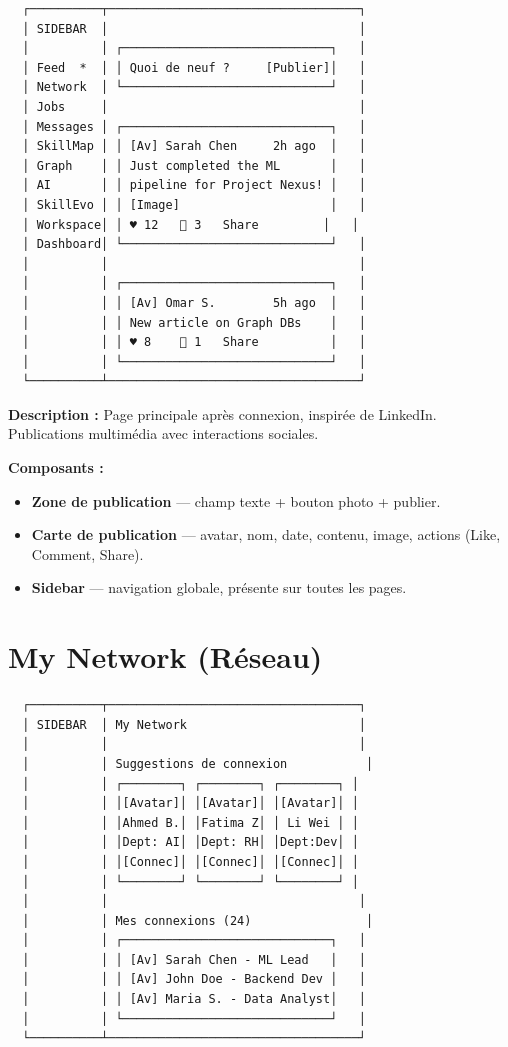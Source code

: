 \documentclass[12pt,a4paper]{article}
\begin{document}
\begin{verbatim}
  ┌──────────┬───────────────────────────────────┐
  │ SIDEBAR  │                                   │
  │          │ ┌─────────────────────────────┐   │
  │ Feed  *  │ │ Quoi de neuf ?     [Publier]│   │
  │ Network  │ └─────────────────────────────┘   │
  │ Jobs     │                                   │
  │ Messages │ ┌─────────────────────────────┐   │
  │ SkillMap │ │ [Av] Sarah Chen     2h ago  │   │
  │ Graph    │ │ Just completed the ML       │   │
  │ AI       │ │ pipeline for Project Nexus! │   │
  │ SkillEvo │ │ [Image]                     │   │
  │ Workspace│ │ ♥ 12   💬 3   Share         │   │
  │ Dashboard│ └─────────────────────────────┘   │
  │          │                                   │
  │          │ ┌─────────────────────────────┐   │
  │          │ │ [Av] Omar S.        5h ago  │   │
  │          │ │ New article on Graph DBs    │   │
  │          │ │ ♥ 8    💬 1   Share          │   │
  │          │ └─────────────────────────────┘   │
  └──────────┴───────────────────────────────────┘
\end{verbatim}

\textbf{Description :} Page principale après connexion, inspirée de LinkedIn. Publications multimédia avec interactions sociales.

\textbf{Composants :}
\begin{itemize}
    \item \textbf{Zone de publication} — champ texte + bouton photo + publier.
    \item \textbf{Carte de publication} — avatar, nom, date, contenu, image, actions (Like, Comment, Share).
    \item \textbf{Sidebar} — navigation globale, présente sur toutes les pages.
\end{itemize}

\section{My Network (Réseau)}

\begin{verbatim}
  ┌──────────┬───────────────────────────────────┐
  │ SIDEBAR  │ My Network                        │
  │          │                                   │
  │          │ Suggestions de connexion           │
  │          │ ┌────────┐ ┌────────┐ ┌────────┐ │
  │          │ │[Avatar]│ │[Avatar]│ │[Avatar]│ │
  │          │ │Ahmed B.│ │Fatima Z│ │ Li Wei │ │
  │          │ │Dept: AI│ │Dept: RH│ │Dept:Dev│ │
  │          │ │[Connec]│ │[Connec]│ │[Connec]│ │
  │          │ └────────┘ └────────┘ └────────┘ │
  │          │                                   │
  │          │ Mes connexions (24)                │
  │          │ ┌─────────────────────────────┐   │
  │          │ │ [Av] Sarah Chen - ML Lead   │   │
  │          │ │ [Av] John Doe - Backend Dev │   │
  │          │ │ [Av] Maria S. - Data Analyst│   │
  │          │ └─────────────────────────────┘   │
  └──────────┴───────────────────────────────────┘
\end{verbatim}
\end{document}
